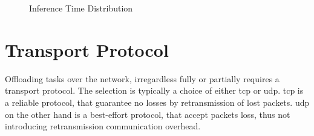 \begin{figure}
	\captionsetup[subfigure]{justification=centering}
	\centering
\end{figure}
\begin{figure}
	\captionsetup[subfigure]{justification=centering}
	\centering
	\caption[Inference Time Distribution]{Inference Time Distribution}
\end{figure}

\section{Transport Protocol} 

Offloading tasks over the network, irregardless fully or partially requires a transport protocol. The selection is typically a choice of either \gls{tcp} or \gls{udp}. \gls{tcp} is a reliable protocol, that guarantee no losses by retransmission of lost packets. \gls{udp} on the other hand is a best-effort protocol, that accept packets loss, thus not introducing retransmission communication overhead. 


